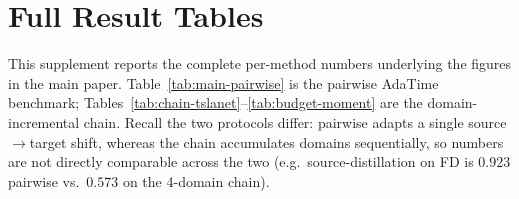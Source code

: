 %

\section{Full Result Tables}
\label{app:full-tables}
This supplement reports the complete per-method numbers underlying the
figures in the main paper. Table~\ref{tab:main-pairwise} is the
pairwise AdaTime benchmark; Tables~\ref{tab:chain-tslanet}--\ref{tab:budget-moment}
are the domain-incremental chain. Recall the two protocols differ: pairwise
adapts a single source$\rightarrow$target shift, whereas the chain
accumulates domains sequentially, so numbers are not directly comparable
across the two (e.g.\ source-distillation on FD is $0.923$ pairwise vs.\
$0.573$ on the 4-domain chain).

